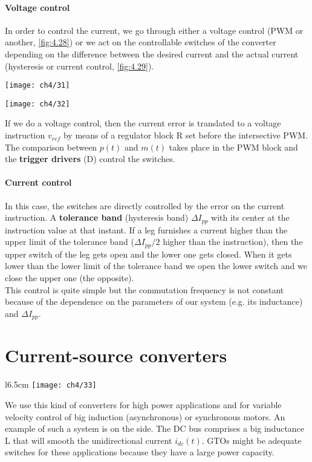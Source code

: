	\paragraph{Voltage control}\quad In order to control the current, we go through either a voltage control (PWM or another, \autoref{fig:4.28}) or we act on the controllable switches of the converter depending on the difference between the desired current and the actual current (hysteresis or current control, \autoref{fig:4.29}). 
	\begin{center}
	\begin{minipage}{0.49\textwidth}
	\texttt{[image: ch4/31]}
	\label{fig:4.28}
	\end{minipage}
	\begin{minipage}{0.49\textwidth}
	\texttt{[image: ch4/32]}
	\label{fig:4.29}
	\end{minipage}
	\end{center}
	
	If we do a voltage control, then the current error is translated to a voltage instruction $v_{ref}$ by means of a regulator block R set before the intersective PWM. The comparison between $p(t)$ and $m(t)$ takes place in the PWM block and the \textbf{trigger drivers} (D) control the switches.
	
	\paragraph{Current control}\quad In this case, the switches are directly controlled by the error on the current instruction. A \textbf{tolerance band} (hysteresis band) $\Delta I_{pp}$ with its center at the instruction value at that instant. If a leg furnishes a current higher than the upper limit of the tolerance band ($\Delta I_{pp}/2$ higher than the instruction), then the upper switch of the leg gets open and the lower one gets closed. When it gets lower than the lower limit of the tolerance band we open the lower switch and we close the upper one (the opposite). \\
	
	This control is quite simple but the commutation frequency is not constant because of the dependence on the parameters of our system (e.g. its inductance) and $\Delta I_{pp}$. 
	
\section{Current-source converters}
	\begin{wrapfigure}[9]{l}{6.5cm}
		\vspace{-5mm}
		\texttt{[image: ch4/33]}
		\end{wrapfigure}
	We use this kind of converters for high power applications and for variable velocity control of big induction (asynchronous) or synchronous motors. An example of such a system is on the side. The DC bus comprises a big inductance L that will smooth the unidirectional current $i_{dc}(t)$. GTOs might be adequate switches for these applications because they have a large power capacity. \\
	
